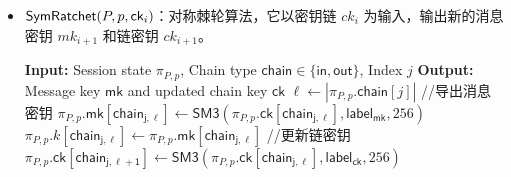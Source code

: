 \begin{definition}[多阶段密钥交换协议]
\begin{itemize}
\begin{algorithm}[H]
\begin{algorithmic}[1]
        \State //生成新的密钥材料用于更新根密钥和链密钥
        \State $(\mathsf{rpk}_{P,p,j+2}, \mathsf{rsk}_{P,p,j+2}) \gets \mathsf{SM2}.\mathsf{KeyGen}()$
        \State $\mathsf{ecss}_{j+1} \gets \mathsf{DH}(\mathsf{rpk}_{P',p',j+1}, \mathsf{rsk}_{P,p,j+2})$ 
        \State $(\mathsf{pqct}_{P,p,j+2}, \mathsf{pqss}_{j+1}) \gets \mathsf{TKEM}.\mathsf{Enc}(\mathsf{pqpk}_{P',p'}, \mathsf{tag}_{P,p,j+2})$
        \State $(\mathsf{rk}_{P,p,j+2}, \mathsf{ck}_{P,j+2}) \gets \mathsf{HKDF}(\mathsf{rk}, \mathsf{ecss}_{j+1}, \mathsf{pqss}_{j+1})$
        \State $\pi_{P, p}.\mathsf{rk}[\mathsf{asmy_{j+1}}] \gets \mathsf{rk'}$ 
        \State $\pi_{P,p}.\mathsf{ck}[\mathsf{out}, j+1, 0] \gets \mathsf{ck}_{P,p,j+2}$ 
        \State \textbf{Save} $\mathsf{rsk}_{P,p,j+2}$ 
    \end{algorithmic}
    \end{algorithm}
  \item $\mathsf{SymRatchet}(P,p, \textsf{ck}_i) $：对称棘轮算法，它以密钥链 $ck_i$ 为输入，输出新的消息密钥 $mk_{i+1}$ 和链密钥 $ck_{i+1}$。
    \begin{algorithm}[H]
    \caption{$\mathsf{SymRatchet}(\pi_{P,p}, \mathsf{chain}, j)$}
    \label{alg:sym_ratchet}
    \begin{algorithmic}[1]
        \State \textbf{Input:} Session state $\pi_{P,p}$, Chain type $\mathsf{chain} \in \{\mathsf{in}, \mathsf{out}\}$, Index $j$
        \State \textbf{Output:} Message key $\mathsf{mk}$ and updated chain key $\mathsf{ck}$
        \State $\ell \gets |\pi_{P,p}.\mathsf{chain}[j]|$ 
        \State //导出消息密钥
        \State $\pi_{P,p}.\mathsf{mk}[\mathsf{chain_{j, \ell}}] \gets \mathsf{SM3}(\pi_{P,p}.\mathsf{ck}[\mathsf{chain_{ j, \ell}}], \mathsf{label}_{\mathsf{mk}}, 256)$
        \State $\pi_{P,p}.k[\mathsf{chain_{j, \ell}}] \gets \pi_{P,p}.\mathsf{mk}[\mathsf{chain_{j, \ell}}]$
        \State //更新链密钥
        \State $\pi_{P,p}.\mathsf{ck}[\mathsf{chain_{j, \ell+1}}] \gets \mathsf{SM3}(\pi_{P,p}.\mathsf{ck}[\mathsf{chain_{j, \ell}}], \mathsf{label}_{\mathsf{ck}}, 256)$
    \end{algorithmic}
    \end{algorithm}
 \end{itemize}
\end{definition}







